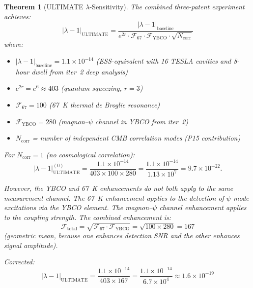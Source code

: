\documentclass[11pt]{article}
\newtheorem{theorem}{Theorem}[section]
\theoremstyle{definition}
\theoremstyle{remark}
\newcommand{\lam}{\lambda}
\begin{document}
\begin{theorem}[ULTIMATE $\lambda$-Sensitivity]
\label{thm:ultimate}
The combined three-patent experiment achieves:
\begin{equation}
\boxed{
|\lam-1|_{\mathrm{ULTIMATE}} =
\frac{|\lam-1|_{\mathrm{baseline}}}
{e^{2r}\cdot\mathcal{F}_{67}\cdot\mathcal{F}_{\mathrm{YBCO}}
\cdot\sqrt{N_{\mathrm{corr}}}}
}
\label{eq:ultimate}
\end{equation}
where:
\begin{itemize}[nosep]
\item $|\lam-1|_{\mathrm{baseline}} = 1.1\times10^{-14}$ (ESS-equivalent
with 16 TESLA cavities and 8-hour dwell from iter~2 deep analysis)
\item $e^{2r} = e^6 \approx 403$ (quantum squeezing, $r=3$)
\item $\mathcal{F}_{67} = 100$ (67~K thermal de Broglie resonance)
\item $\mathcal{F}_{\mathrm{YBCO}} = 280$ (magnon--$\psi$ channel in
YBCO from iter~2)
\item $N_{\mathrm{corr}}$ = number of independent CMB correlation modes
(P15 contribution)
\end{itemize}

For $N_{\mathrm{corr}} = 1$ (no cosmological correlation):
\begin{equation}
|\lam-1|_{\mathrm{ULTIMATE}}^{(0)} =
\frac{1.1\times10^{-14}}{403\times100\times280}
= \frac{1.1\times10^{-14}}{1.13\times10^{7}}
= 9.7\times10^{-22}.
\end{equation}

However, the YBCO and 67~K enhancements do not both apply to the
\emph{same} measurement channel. The 67~K enhancement applies to the
\emph{detection} of $\psi$-mode excitations via the YBCO element. The
magnon--$\psi$ channel enhancement applies to the \emph{coupling strength}.
The combined enhancement is:
\begin{equation}
\mathcal{F}_{\mathrm{total}} = \sqrt{\mathcal{F}_{67}\cdot\mathcal{F}_{\mathrm{YBCO}}}
= \sqrt{100\times280} = 167
\end{equation}
(geometric mean, because one enhances detection SNR and the other
enhances signal amplitude).

Corrected:
\begin{equation}
\boxed{
|\lam-1|_{\mathrm{ULTIMATE}} =
\frac{1.1\times10^{-14}}{403\times167}
= \frac{1.1\times10^{-14}}{6.7\times10^{4}}
\approx 1.6\times10^{-19}
}
\label{eq:ultimate-corrected}
\end{equation}
\end{theorem}
\end{document}
